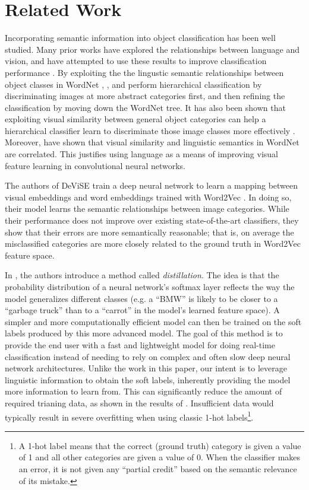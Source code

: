 \section{Related Work}


Incorporating semantic information into object classification has been well
studied. Many prior works have explored the relationships between language and
vision, and have attempted to use these results to improve classification
performance \cite{izadinia2015segment, frome2013devise}.
By exploiting the the lingustic semantic relationships between object classes
in WordNet \cite{miller1995wordnet}, \cite{marszalek2007semantic}, and
\cite{grauman2011learning} perform hierarchical classification by
discriminating images at more abstract categories first, and then refining the
classification by moving down the WordNet tree.
It has also been shown that exploiting visual similarity between general object
categories can help a hierarchical classifier learn to discriminate those image
classes more effectively \cite{li2010building}.
Moreover, \cite{deselaers2011visual} have shown that visual similarity and
linguistic semantics in WordNet are correlated. This justifies using language
as a means of improving visual feature learning in convolutional neural
networks.


The authors of DeViSE \cite{frome2013devise} train a deep neural network to
learn a mapping between visual embeddings and word embeddings trained with
Word2Vec \cite{mikolov2013distributed}. In doing so, their model learns the
semantic relationships between image categories. While their performance does
not improve over existing state-of-the-art classifiers, they show that their
errors are more semantically reasonable; that is, on average the misclassified
categories are more closely related to the ground truth in Word2Vec feature
space.


In \cite{hinton2015distilling}, the authors introduce a method called
\emph{distillation}. The idea is that the probability distribution of a neural
network's softmax layer reflects the way the model generalizes different
classes (e.g. a ``BMW'' is likely to be closer to a ``garbage truck'' than to a
``carrot'' in the model's learned feature space). A simpler and more
computationally efficient model can then be trained on the soft labels produced
by this more advanced model.
The goal of this method is to provide the end user with a fast and lightweight
model for doing real-time classification instead of needing to rely on complex
and often slow deep neural network architectures.
Unlike the work in this paper, our intent is to leverage linguistic information
to obtain the soft labels, inherently providing the model more information to
learn from. This can significantly reduce the amount of required trianing data,
as shown in the results of \cite{hinton2015distilling}. Insufficient data would
typically result in severe overfitting when using classic
1-hot labels\footnote{
  A 1-hot label means that the correct (ground truth) category is given a value
  of 1 and all other categories are given a value of 0. When the classifier
  makes an error, it is not given any ``partial credit'' based on the semantic
  relevance of its mistake.
}.


